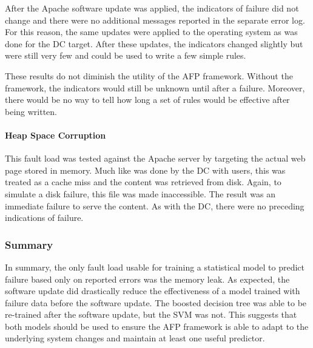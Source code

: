 After the Apache software update was applied, the indicators of failure did not
change and there were no additional messages reported in the separate error
log.  For this reason, the same updates were applied to the operating system as
was done for the \ac{DC} target.  After these updates, the indicators changed
slightly but were still very few and could be used to write a few simple rules.

These results do not diminish the utility of the \ac{AFP} framework.  Without
the framework, the indicators would still be unknown until after a failure.
Moreover, there would be no way to tell how long a set of rules would be
effective after being written.

\paragraph{Heap Space Corruption}
This fault load was tested against the Apache server by targeting the actual
web page stored in memory.  Much like was done by the \ac{DC} with users, this
was treated as a cache miss and the content was retrieved from disk.  Again, to
simulate a disk failure, this file was made inaccessible.  The result was an
immediate failure to serve the content.  As with the \ac{DC}, there were no
preceding indications of failure.

\subsubsection{Summary}
In summary, the only fault load usable for training a statistical model to
predict failure based only on reported errors was the memory leak.  As
expected, the software update did drastically reduce the effectiveness of a
model trained with failure data before the software update.  The boosted
decision tree was able to be re-trained after the software update, but the
\ac{SVM} was not.  This suggests that both models should be used to ensure the
\ac{AFP} framework is able to adapt to the underlying system changes and
maintain at least one useful predictor.

